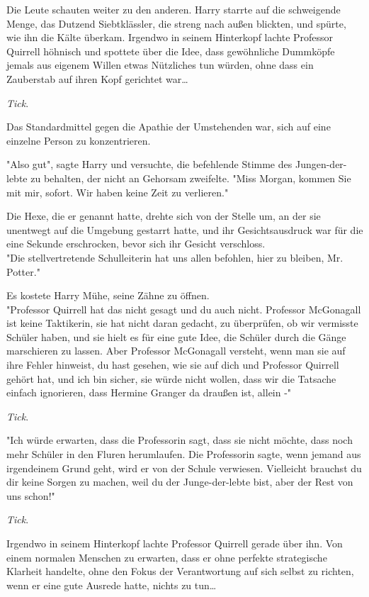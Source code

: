 {Die Leute schauten weiter zu den anderen. Harry starrte auf die schweigende Menge, das Dutzend Siebtklässler, die streng nach außen blickten, und spürte, wie ihn die Kälte überkam. Irgendwo in seinem Hinterkopf lachte Professor Quirrell höhnisch und spottete über die Idee, dass gewöhnliche Dummköpfe jemals aus eigenem Willen etwas Nützliches tun würden, ohne dass ein Zauberstab auf ihren Kopf gerichtet war…

\emph{Tick}.

Das Standardmittel gegen die Apathie der Umstehenden war, sich auf eine einzelne Person zu konzentrieren.

"Also gut", sagte Harry und versuchte, die befehlende Stimme des Jungen-der-lebte zu behalten, der nicht an Gehorsam zweifelte. "Miss Morgan, kommen Sie mit mir, sofort. Wir haben keine Zeit zu verlieren."

Die Hexe, die er genannt hatte, drehte sich von der Stelle um, an der sie unentwegt auf die Umgebung gestarrt hatte, und ihr Gesichtsausdruck war für die eine Sekunde erschrocken, bevor sich ihr Gesicht verschloss.\\ "Die stellvertretende Schulleiterin hat uns allen befohlen, hier zu bleiben, Mr. Potter."

Es kostete Harry Mühe, seine Zähne zu öffnen.\\ "Professor Quirrell hat das nicht gesagt und du auch nicht. Professor McGonagall ist keine Taktikerin, sie hat nicht daran gedacht, zu überprüfen, ob wir vermisste Schüler haben, und sie hielt es für eine gute Idee, die Schüler durch die Gänge marschieren zu lassen. Aber Professor McGonagall versteht, wenn man sie auf ihre Fehler hinweist, du hast gesehen, wie sie auf dich und Professor Quirrell gehört hat, und ich bin sicher, sie würde nicht wollen, dass wir die Tatsache einfach ignorieren, dass Hermine Granger da draußen ist, allein -"

\emph{Tick}.

"Ich würde erwarten, dass die Professorin sagt, dass sie nicht möchte, dass noch mehr Schüler in den Fluren herumlaufen. Die Professorin sagte, wenn jemand aus irgendeinem Grund geht, wird er von der Schule verwiesen. Vielleicht brauchst du dir keine Sorgen zu machen, weil du der Junge-der-lebte bist, aber der Rest von uns schon!"

\emph{Tick}.

Irgendwo in seinem Hinterkopf lachte Professor Quirrell gerade über ihn. Von einem normalen Menschen zu erwarten, dass er ohne perfekte strategische Klarheit handelte, ohne den Fokus der Verantwortung auf sich selbst zu richten, wenn er eine gute Ausrede hatte, nichts zu tun…

}
